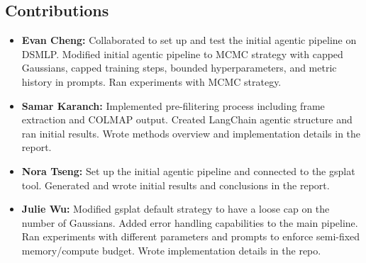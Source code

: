 \subsection{Contributions}
\begin{itemize}
    \item \textbf{Evan Cheng:} Collaborated to set up  and test the initial agentic pipeline on DSMLP. Modified initial agentic pipeline to MCMC strategy with capped Gaussians, capped training steps, bounded hyperparameters, and metric history in prompts. Ran experiments with MCMC strategy.
    \item \textbf{Samar Karanch:}  Implemented pre-filitering process including frame extraction and COLMAP output. Created LangChain agentic structure and ran initial results. Wrote methods overview and implementation details in the report.
    \item \textbf{Nora Tseng:} Set up the initial agentic pipeline and connected to the gsplat tool. Generated and wrote initial results and conclusions in the report.
    \item \textbf{Julie Wu:} Modified gsplat default strategy to have a loose cap on the number of Gaussians. Added error handling capabilities to the main pipeline. Ran experiments with different parameters and prompts to enforce semi-fixed memory/compute budget. Wrote implementation details in the repo.\\
\end{itemize}